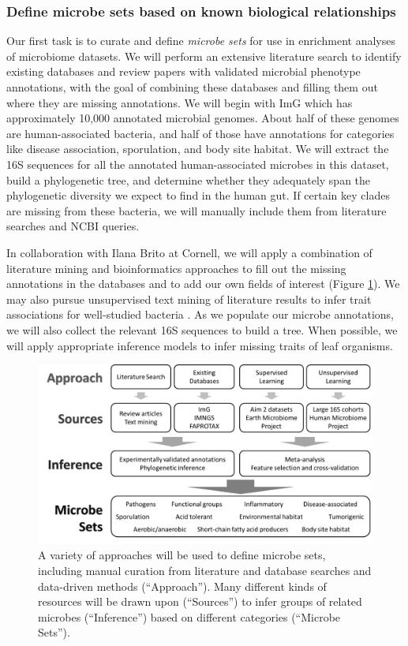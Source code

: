 \documentclass[12pt]{article}
\begin{document}
\subsubsection{Define microbe sets based on known biological relationships}\label{sec:set_curation}

Our first task is to curate and define \textit{microbe sets} for use in enrichment analyses of 
microbiome datasets. We will perform an extensive literature search
to identify existing databases and review papers with validated microbial phenotype annotations, with the goal of
combining these databases and filling them out where they are missing annotations.
We will begin with ImG which has approximately 10,000 annotated microbial genomes. 
About half of these genomes are human-associated bacteria, 
and half of those have annotations for categories like disease 
association, sporulation, and body site habitat. 
We will extract the 16S sequences for all the annotated human-associated 
microbes in this dataset, build a phylogenetic tree, and determine whether 
they adequately span the phylogenetic diversity we expect to 
find in the human gut. If certain key clades are missing from these 
bacteria, we will manually include them from literature searches and 
NCBI queries.

In collaboration with Ilana Brito at Cornell, we will apply a 
combination of literature mining and bioinformatics approaches to fill 
out the missing annotations in the databases and to add our own fields 
of interest (Figure \ref{fig:microbe_sets}). We may also 
pursue unsupervised text mining of literature results to infer trait 
associations for well-studied bacteria \cite{korbel-lit_mining-2005}. As we populate 
our microbe annotations, we will also collect the relevant 16S sequences to 
build a tree. When possible, we will apply appropriate inference models to infer 
missing traits of leaf organisms.

\begin{figure}
\begin{center}
	\includegraphics[scale=0.5]{microbe_sets}
	\caption{A variety of approaches will be used to define
	microbe sets, including manual curation from literature
	and database searches and data-driven methods (``Approach'').
	Many different kinds of resources will be drawn upon 
	(``Sources'') to infer groups of related microbes 
	(``Inference'') based on different categories 
	(``Microbe Sets'').}
	\label{fig:microbe_sets}
\end{center}
\end{figure}
\end{document}
